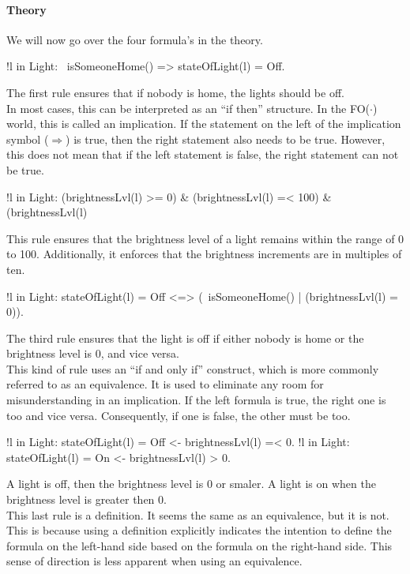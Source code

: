 \documentclass[11pt,a4paper]{report}
\newcommand{\fodot}{FO($\cdot$)\xspace}
\begin{document}
\paragraph{Theory}
We will now go over the four formula's in the theory.
\begin{idplisting}
!l in Light: ~isSomeoneHome() => stateOfLight(l) = Off.
\end{idplisting}
The first rule ensures that if nobody is home, the lights should be off.\\
In most cases, this can be interpreted as an ``if then'' structure. In the \fodot world, this is called an implication. If the statement on the left of the implication symbol ($\Rightarrow$) is true, then the right statement also needs to be true. However, this does not mean that if the left statement is false, the right statement can not be true.
\begin{idplisting}
!l in Light: (brightnessLvl(l) >= 0) & (brightnessLvl(l) =< 100) & (brightnessLvl(l) %
\end{idplisting}
This rule ensures that the brightness level of a light remains within the range of 0 to 100. Additionally, it enforces that the brightness increments are in multiples of ten.
\begin{idplisting}
!l in Light: stateOfLight(l) = Off <=> (~isSomeoneHome() | (brightnessLvl(l) = 0)).
\end{idplisting}
The third rule ensures that the light is off if either nobody is home or the brightness level is 0, and vice versa.\\
This kind of rule uses an ``if and only if'' construct, which is more commonly referred to as an equivalence. It is used to eliminate any room for misunderstanding in an implication. If the left formula is true, the right one is too and vice versa. Consequently, if one is false, the other must be too.

\begin{idplisting}
{
   !l in Light: stateOfLight(l) = Off <- brightnessLvl(l) =< 0.
   !l in Light: stateOfLight(l) = On <- brightnessLvl(l) > 0.
}
\end{idplisting}
A light is off, then the brightness level is 0 or smaler. A light is on when the brightness level is greater then 0.\\
This last rule is a definition. It seems the same as an equivalence, but it is not. This is because using a definition explicitly indicates the intention to define the formula on the left-hand side based on the formula on the right-hand side. This sense of direction  is less apparent when using an equivalence.
\end{document}

